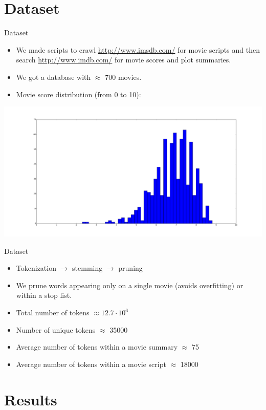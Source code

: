 \documentclass{beamer}
\begin{document}
\section{Dataset}

\begin{frame}{Dataset}
	\begin{itemize}
	\item We made scripts to crawl \url{http://www.imsdb.com/} for movie scripts and then search \url{http://www.imdb.com/} for movie scores and plot summaries.
	\item We got a database with $\approx$ 700 movies.
	\item Movie score distribution (from 0 to 10):
	\end{itemize}

	\includegraphics[width=\textwidth]{scores_histogram.png}
\end{frame}

\begin{frame}{Dataset}
	\begin{itemize}
	\item Tokenization $\rightarrow$ stemming $\rightarrow$ pruning
	\item We prune words appearing only on a single movie (avoids overfitting) or within a stop list.
	\item Total number of tokens $\approx 12.7 \cdot 10^6$
	\item Number of unique tokens $\approx$ 35000
	\item Average number of tokens within a movie summary $\approx$ 75
	\item Average number of tokens within a movie script $\approx$ 18000
	\end{itemize}
\end{frame}

\section{Results}
\end{document}
